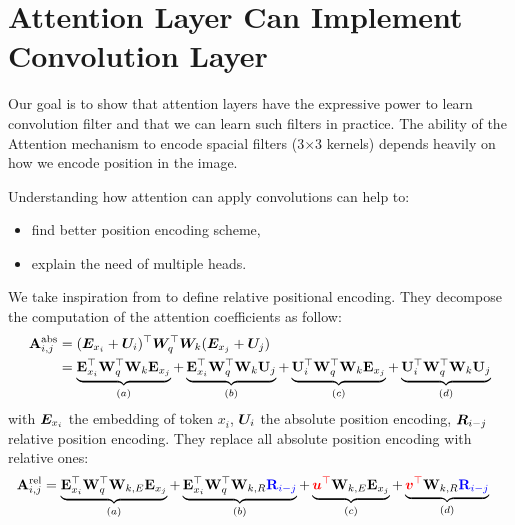 \documentclass{article} %
\begin{document}
\section{Attention Layer Can Implement Convolution Layer}

Our goal is to show that attention layers have the expressive power to learn 
convolution filter and that we can learn such filters in practice.
%
The ability of the Attention mechanism to encode spacial filters (3$\times$3 kernels) 
depends heavily on how we encode position in the image.


Understanding how attention can apply convolutions can help to:
\begin{itemize}
  \item find better position encoding scheme,
  \item explain the need of multiple heads.
\end{itemize}

We take inspiration from \citep[TransformerXL]{dai2019transformerxl} to define relative positional encoding.
They decompose the computation of the attention coefficients as follow:
\begin{align}
    \mathbf{A}_{i, j}^{\mathrm{abs}} &= ({\bm{E}}_{x_i} + {\bm{U}}_i)^\top {\bm{W}}_q^\top {\bm{W}}_k ({\bm{E}}_{x_j} + {\bm{U}}_j)\\
 &=
  \underbrace{\mathbf{E}_{x_{i}}^{\top} \mathbf{W}_{q}^{\top} \mathbf{W}_{k} \mathbf{E}_{x_{j}}}_{(a)} 
  +
  \underbrace{\mathbf{E}_{x_{i}}^{\top} \mathbf{W}_{q}^{\top} \mathbf{W}_{k} \mathbf{U}_{j}}_{(b)}
  +
  \underbrace{\mathbf{U}_{i}^{\top} \mathbf{W}_{q}^{\top} \mathbf{W}_{k} \mathbf{E}_{x_{j}}}_{(c)}
  +
  \underbrace{\mathbf{U}_{i}^{\top} \mathbf{W}_{q}^{\top} \mathbf{W}_{k} \mathbf{U}_{j}}_{(d)}
\end{align}
with ${\bm{E}}_{x_i}$ the embedding of token $x_i$, ${\bm{U}}_i$ the absolute position encoding, ${\bm{R}}_{i-j}$ relative position encoding. They replace all absolute position encoding with relative ones:
\begin{align}
  \mathbf{A}_{i, j}^{\mathrm{rel}} &=
  \underbrace{\mathbf{E}_{x_{i}}^{\top} \mathbf{W}_{q}^{\top} \mathbf{W}_{k, E} \mathbf{E}_{x_{j}}}_{(a)}
  +
  \underbrace{\mathbf{E}_{x_{i}}^{\top} \mathbf{W}_{q}^{\top} \mathbf{W}_{k, R} {\color{blue} \mathbf{R}_{i-j}}}_{(b)}
  +
  \underbrace{{\color{red} {\bm{u}}^{\top}} \mathbf{W}_{k, E} \mathbf{E}_{x_{j}}}_{(c)}
  +
  \underbrace{{\color{red} {\bm{v}}^{\top}} \mathbf{W}_{k, R} {\color{blue} \mathbf{R}_{i-j}}}_{(d)}
  \label{eq:att_rel}
\end{align}
\end{document}
